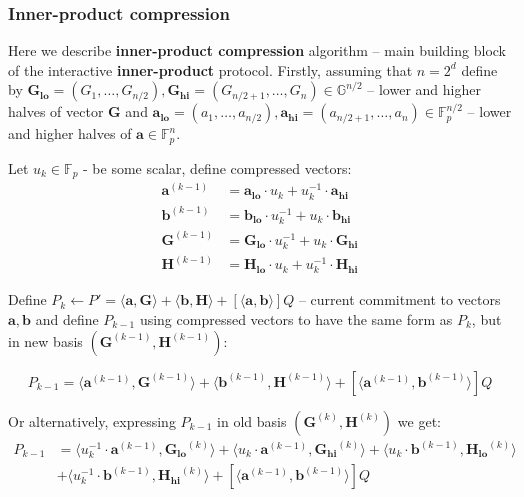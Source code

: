 \documentclass[../lecture-notes-148x210.tex]{subfiles}
\begin{document}
\subsubsection{Inner-product compression}

Here we describe \textbf{inner-product compression} algorithm -- main building block of the interactive \textbf{inner-product} protocol.
Firstly, assuming that $n = 2^d$ define by $\mathbf{G_{lo}} = (G_1, \dots, G_{n/2}), \mathbf{G_{hi}} = (G_{n/2+1},\dots, G_n) \in \mathbb{G}^{n/2}$ -- lower and higher halves of vector $\mathbf{G}$ and $\mathbf{a_{lo}} = (a_1, \dots, a_{n/2}), \mathbf{a_{hi}} = (a_{n/2+1},\dots,a_n) \in \mathbb{F}_p^{n/2}$ -- lower and higher halves of $\mathbf{a} \in \mathbb{F}_p^{n}$.

Let $u_k \in \mathbb{F}_p$ - be some scalar, define compressed vectors:
\begin{align*}
    \mathbf{a}^{(k-1)} &= \mathbf{a_{lo}} \cdot u_k + u_k^{-1} \cdot \mathbf{a_{hi}} \\
    \mathbf{b}^{(k-1)} &= \mathbf{b_{lo}} \cdot u_k^{-1} + u_k \cdot \mathbf{b_{hi}} \\
    \mathbf{G}^{(k-1)} &= \mathbf{G_{lo}} \cdot u_k^{-1} + u_k \cdot \mathbf{G_{hi}} \\
    \mathbf{H}^{(k-1)} &= \mathbf{H_{lo}} \cdot u_k + u_k^{-1} \cdot \mathbf{H_{hi}}
\end{align*}

Define $P_k \gets P' =  \langle \mathbf{a,G} \rangle + \langle \mathbf{b,H} \rangle + [\langle \mathbf{a,b} \rangle]Q$ -- current commitment to vectors $\mathbf{a,b}$ and define $P_{k-1}$ using compressed vectors to have the same form as $P_k$, but in new basis $(\mathbf{G}^{(k-1)}, \mathbf{H}^{(k-1)})$:

\begin{equation}
    P_{k-1} = \langle \mathbf{a}^{(k-1)}, \mathbf{G}^{(k-1)} \rangle + \langle \mathbf{b}^{(k-1)}, \mathbf{H}^{(k-1)} \rangle + [\langle \mathbf{a}^{(k-1)}, \mathbf{b}^{(k-1)} \rangle]Q
    \label{eq:p_k_1_from_new_basis}
\end{equation}

Or alternatively, expressing $P_{k-1}$ in old basis $(\mathbf{G}^{(k)}, \mathbf{H}^{(k)})$ we get:
\begin{equation}
    \begin{aligned}
    P_{k-1} &= \langle u_k^{-1} \cdot \mathbf{a}^{(k-1)}, \mathbf{G_{lo}}^{(k)} \rangle + \langle u_k \cdot \mathbf{a}^{(k-1)}, \mathbf{G_{hi}}^{(k)} \rangle + \langle u_k \cdot \mathbf{b}^{(k-1)}, \mathbf{H_{lo}}^{(k)} \rangle \\
    &+ \langle u_k^{-1} \cdot \mathbf{b}^{(k-1)}, \mathbf{H_{hi}}^{(k)} \rangle + [\langle \mathbf{a}^{(k-1)}, \mathbf{b}^{(k-1)} \rangle]Q
    \label{eq:p_k_1_from_old_basis}
    \end{aligned}
\end{equation}
\end{document}
